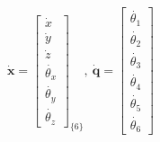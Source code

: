\begin{equation*}
\begin{split}
\boldsymbol{\dot{x}}
=
\begin{bmatrix}
\dot{x}\\
\dot{y}\\
\dot{z}\\
\dot{\theta _x}\\
\dot{\theta _y}\\
\dot{\theta _z}
\end{bmatrix}_{\!\{6\}}
,\ 
\boldsymbol{\dot{q}}
=
\begin{bmatrix}
\dot{\theta _1} \\ 
\dot{\theta _2} \\ 
\dot{\theta _3} \\ 
\dot{\theta _4} \\ 
\dot{\theta _5} \\ 
\dot{\theta _6} 
\end{bmatrix}
\end{split}
\end{equation*}
